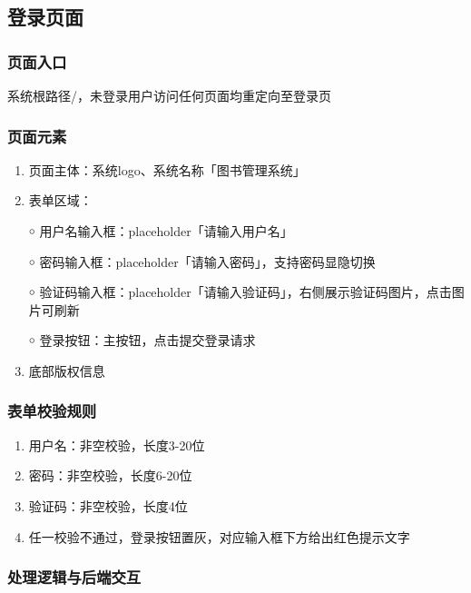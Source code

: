 \documentclass[12pt, a4paper]{article}
\begin{document}
\subsection{登录页面}

\subsubsection{页面入口}

系统根路径/，未登录用户访问任何页面均重定向至登录页

\subsubsection{页面元素}

\begin{enumerate}
\item  页面主体：系统logo、系统名称「图书管理系统」

\item  表单区域：

￮ 用户名输入框：placeholder「请输入用户名」

￮ 密码输入框：placeholder「请输入密码」，支持密码显隐切换

￮ 验证码输入框：placeholder「请输入验证码」，右侧展示验证码图片，点击图片可刷新

￮ 登录按钮：主按钮，点击提交登录请求

\item  底部版权信息
\end{enumerate}

\subsubsection{表单校验规则}

\begin{enumerate}
\item  用户名：非空校验，长度3-20位

\item  密码：非空校验，长度6-20位

\item  验证码：非空校验，长度4位

\item  任一校验不通过，登录按钮置灰，对应输入框下方给出红色提示文字
\end{enumerate}

\subsubsection{处理逻辑与后端交互}
\end{document}
